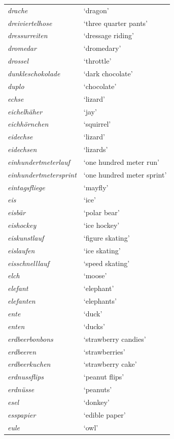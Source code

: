 \begin{longtable}{ll}
\textit{drache} & `dragon' \\
\textit{dreiviertelhose} & `three quarter pants' \\
\textit{dressurreiten} & `dressage riding' \\
\textit{dromedar} & `dromedary' \\
\textit{drossel} & `throttle' \\
\textit{dunkleschokolade} & `dark chocolate' \\
\textit{duplo} & `chocolate' \\
\textit{echse} & `lizard' \\
\textit{eichelhäher} & `jay' \\
\textit{eichhörnchen} & `squirrel' \\
\textit{eidechse} & `lizard' \\
\textit{eidechsen} & `lizards' \\
\textit{einhundertmeterlauf} & `one hundred meter run' \\
\textit{einhundertmetersprint} & `one hundred meter sprint' \\
\textit{eintagsfliege} & `mayfly' \\
\textit{eis} & `ice' \\
\textit{eisbär} & `polar bear' \\
\textit{eishockey} & `ice hockey' \\
\textit{eiskunstlauf} & `figure skating' \\
\textit{eislaufen} & `ice skating' \\
\textit{eisschnelllauf} & `speed skating' \\
\textit{elch} & `moose' \\
\textit{elefant} & `elephant' \\
\textit{elefanten} & `elephants' \\
\textit{ente} & `duck' \\
\textit{enten} & `ducks' \\
\textit{erdbeerbonbons} & `strawberry candies' \\
\textit{erdbeeren} & `strawberries' \\
\textit{erdbeerkuchen} & `strawberry cake' \\
\textit{erdnussflips} & `peanut flips' \\
\textit{erdnüsse} & `peanuts' \\
\textit{esel} & `donkey' \\
\textit{esspapier} & `edible paper' \\
\textit{eule} & `owl' \\

\end{longtable}
